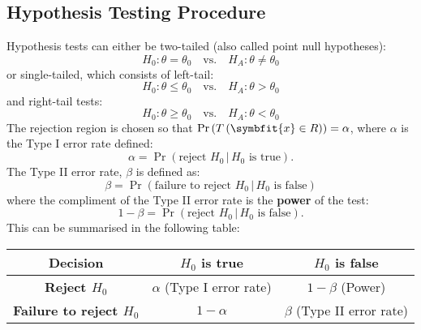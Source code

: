 \documentclass{article}
\begin{document}
\subsection{Hypothesis Testing Procedure}
Hypothesis tests can either be two-tailed (also called point null hypotheses):
\begin{equation*}
    H_0: \theta = \theta_0 \quad \text{vs.} \quad H_A: \theta \neq \theta_0
\end{equation*}
or single-tailed, which consists of left-tail:
\begin{equation*}
    H_0: \theta \leq \theta_0 \quad \text{vs.} \quad H_A: \theta > \theta_0
\end{equation*}
and right-tail tests:
\begin{equation*}
    H_0: \theta \geq \theta_0 \quad \text{vs.} \quad H_A: \theta < \theta_0
\end{equation*}
The rejection region is chosen so that \(\Pr{\left( T\left( \symbfit{x} \in R \right) \right)} = \alpha\),
where \(\alpha\) is the Type I error rate defined:
\begin{equation*}
    \alpha = \Pr{\left( \text{reject \(H_0\)} \,\vert\, \text{\(H_0\) is true} \right)}.
\end{equation*}
The Type II error rate, \(\beta\) is defined as:
\begin{equation*}
    \beta = \Pr{\left( \text{failure to reject \(H_0\)} \,\vert\, \text{\(H_0\) is false} \right)}
\end{equation*}
where the compliment of the Type II error rate is the \textbf{power} of the test:
\begin{equation*}
    1 - \beta = \Pr{\left( \text{reject \(H_0\)} \,\vert\, \text{\(H_0\) is false} \right)}.
\end{equation*}
This can be summarised in the following table:
\begin{center}
    \begin{tabular}{c|cc}
        \toprule
        \textbf{Decision}                  & \textbf{\(H_0\) is true}       & \textbf{\(H_0\) is false}      \\
        \midrule
        \textbf{Reject \(H_0\)}            & \(\alpha\) (Type I error rate) & \(1 - \beta\) (Power)          \\
        \textbf{Failure to reject \(H_0\)} & \(1 - \alpha\)                 & \(\beta\) (Type II error rate) \\
        \bottomrule
    \end{tabular}
\end{center}
\end{document}
